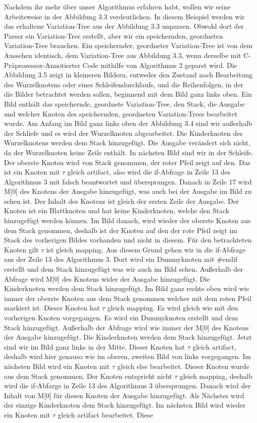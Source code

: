 Nachdem ihr mehr über unser Algorithmus erfahren habt, wollen wir seine Arbeitsweise in der Abbildung 3.3 verdeutlichen. In diesem Beispiel werden wir das erhaltene Variation-Tree aus der Abbildung 3.3 unparsen. Obwohl dort der Parser ein Variation-Tree erstellt, aber wir ein speichernden, geordneten Variation-Tree brauchen. Ein speichernder, geordneter Variation-Tree ist von dem Aussehen identisch, dem Variation-Tree aus Abbildung 3.3, wenn derselbe mit C-Präprozessor-Annotierter Code mithilfe von Algorithmus 2 geparst wird. Die Abbildung 3.5 zeigt in kleineren Bildern, entweder den Zustand nach Bearbeitung des Wurzelknotens oder eines Schleifendurchlaufs, und die Reihenfolgen, in der die Bilder betrachtet werden sollen, beginnend mit dem Bild ganz links oben. Ein Bild enthält das speichernde, geordnete Variation-Tree, den Stack, die Ausgabe und welcher Knoten des speichernden, geordneten Variation-Trees bearbeitet wurde. Am Anfang im Bild ganz links oben der Abbildung 3.4 sind wir außerhalb der Schliefe und es wird der Wurzelknoten abgearbeitet. Die Kinderknoten des Wurzelknotens werden dem Stack hinzugefügt. Die Ausgabe verändert sich nicht, da der Wurzelknoten keine Zeile enthält. In nächsten Bild sind wir in der Schleife. Der oberste Knoten wird von Stack genommen, der roter Pfeil zeigt auf den. Das ist ein Knoten mit $\tau$ gleich artifact, also wird die if-Abfrage in Zeile 13 des Algorithmus 3 mit falsch beantwortet und übersprungen. Danach in Zeile 17 wird M[0] des Knotens der Ausgabe hinzugefügt, was auch bei der Ausgabe im Bild zu sehen ist. Der Inhalt des Knotens ist gleich der ersten Zeile der Ausgabe. Der Knoten ist ein Blattknoten und hat keine Kinderknoten, welche den Stack hinzugefügt werden können. Im Bild danach, wird wieder der oberste Knoten aus dem Stack genommen, deshalb ist der Knoten auf den der rote Pfeil zeigt im Stack des vorherigen Bildes vorhanden und nicht in diesem. Für den betrachteten Knoten gilt $\tau$ ist gleich mapping. Aus diesem Grund gehen wir in die if-Abfrage aus der Zeile 13 des Algorithmus 3. Dort wird ein Dummyknoten mit \#endif erstellt und dem Stack hinzugefügt was wir auch im Bild sehen. Außerhalb der Abfrage wird M[0] des Knotens wider der Ausgabe hinzugefügt. Die Kinderknoten werden dem Stack hinzugefügt. Im Bild ganz rechts oben wird wie immer der oberste Knoten aus dem Stack genommen welcher mit dem roten Pfeil markiert ist. Dieser Knoten hat $\tau$ gleich mapping. Es wird gleich wie mit den vorherigen Knoten vorgegangen. Es wird ein Dummyknoten erstellt und dem Stack hinzugefügt. Außerhalb der Abfrage wird wie immer der M[0] des Knotens der Ausgabe hinzugefügt. Die Kinderknoten werden dem Stack hinzugefügt. Jetzt sind wir im Bild ganz links in der Mitte. Dieser Knoten hat $\tau$ gleich artifact, deshalb wird hier genauso wie im oberen, zweiten Bild von links vorgegangen. Im nächsten Bild wird ein Knoten mit $\tau$ gleich else bearbeitet. Dieser Knoten wurde aus dem Stack genommen. Der Knoten entspricht nicht $\tau$ gleich mapping, deshalb wird die if-Abfarge in Zeile 13 des Algorithmus 3 übersprungen. Danach wird der Inhalt von M[0] für diesen Knoten der Ausgabe hinzugefügt. Als Nächstes wird der einzige Kinderknoten dem Stack hinzugefügt. Im nächsten Bild wird wieder ein Knoten mit $\tau$ gleich artifact bearbeitet. Diese 